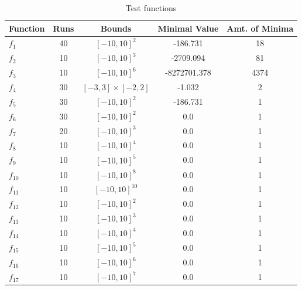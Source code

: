 \documentclass[a4paper,12pt,twoside]{article}
\begin{document}
\begin{table}[H]
\centering
\begin{tabular}{lcccc}
\hline
Function & Runs & Bounds & Minimal Value & Amt. of Minima \\
\hline
$f_1$ & 40 & $[-10, 10]^2$ & -186.731 & 18 \\
$f_2$ & 10 & $[-10, 10]^3$ & -2709.094 & 81 \\
$f_3$ & 10 & $[-10, 10]^6$ & -8272701.378 & 4374 \\
$f_4$ & 30 & $[-3, 3] \times [-2, 2]$ & -1.032 & 2 \\
$f_5$ & 30 & $[-10, 10]^2$ & -186.731 & 1 \\
$f_6$ & 30 & $[-10, 10]^2$ & 0.0 & 1 \\
$f_7$ & 20 & $[-10, 10]^3$ & 0.0 & 1 \\
$f_8$ & 10 & $[-10, 10]^4$ & 0.0 & 1 \\
$f_9$ & 10 & $[-10, 10]^5$ & 0.0 & 1 \\
$f_{10}$ & 10 & $[-10, 10]^8$ & 0.0 & 1 \\
$f_{11}$ & 10 & $[-10, 10]^{10}$ & 0.0 & 1 \\
$f_{12}$ & 10 & $[-10, 10]^{2}$ & 0.0 & 1 \\
$f_{13}$ & 10 & $[-10, 10]^{3}$ & 0.0 & 1 \\
$f_{14}$ & 10 & $[-10, 10]^{4}$ & 0.0 & 1 \\
$f_{15}$ & 10 & $[-10, 10]^{5}$ & 0.0 & 1 \\
$f_{16}$ & 10 & $[-10, 10]^{6}$ & 0.0 & 1 \\
$f_{17}$ & 10 & $[-10, 10]^{7}$ & 0.0 & 1 \\
\hline
\end{tabular}
\caption{Test functions}
\label{tab:test_functions}
\end{table}
\end{document}

